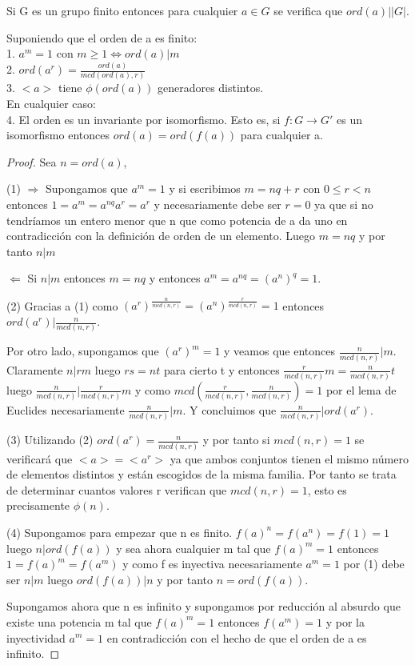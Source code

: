 \begin{ncor}
Si G es un grupo finito entonces para cualquier $a \in G$ se verifica que $ord(a) | |G|$.
\end{ncor}

\begin{nprop}
Suponiendo que el orden de a es finito: \\
1. $a^m = 1$ con $m \ge 1 \iff ord(a) | m$ \\
2. $ord(a^r) = \frac{ord(a)}{mcd(ord(a),r)}$ \\
3. $<a>$ tiene $\phi(ord(a))$ generadores distintos. \\
En cualquier caso: \\
4. El orden es un invariante por isomorfismo. Esto es, si $f:G \rightarrow G'$ es un isomorfismo entonces $ord(a) = ord(f(a))$ para cualquier a.
\end{nprop}
\begin{proof}
Sea $n = ord(a)$,

(1) $\Rightarrow$ Supongamos que $a^m = 1$ y si escribimos $m = nq + r$ con $0 \le r < n$ entonces $1=a^m = a^{nq}a^r = a^r$ y necesariamente debe ser $r = 0$ ya que si no tendríamos un entero menor que n que como potencia de a da uno en contradicción con la definición de orden de un elemento. Luego $m = nq$ y por tanto $n | m$

$\Leftarrow$ Si $n|m$ entonces $m = nq$ y entonces $a^m = a^{nq} = (a^n)^q = 1$.

(2) Gracias a (1) como $(a^r)^{\frac{n}{mcd(n,r)}} = (a^n)^{\frac{r}{mcd(n,r)}} = 1$ entonces $ord(a^r) | \frac{n}{mcd(n,r)}$. 

Por otro lado, supongamos que $(a^r)^m = 1$ y veamos que entonces $\frac{n}{mcd(n,r)} | m$. Claramente $n | rm$ luego $rs = nt$ para cierto t y entonces $\frac{r}{mcd(n,r)}m = \frac{n}{mcd(n,r)}t$ luego $\frac{n}{mcd(n,r)} | \frac{r}{mcd(n,r)}m$ y como $mcd\left(\frac{r}{mcd(n,r)},\frac{n}{mcd(n,r)}\right) = 1$ por el lema de Euclides necesariamente $\frac{n}{mcd(n,r)} | m$. Y concluimos que $\frac{n}{mcd(n,r)} | ord(a^r)$.

(3) Utilizando (2) $ord(a^r) = \frac{n}{mcd(n,r)}$ y por tanto si $mcd(n,r) = 1$  se verificará que $<a> = <a^r>$ ya que ambos conjuntos tienen el mismo número de elementos distintos y están escogidos de la misma familia. Por tanto se trata de determinar cuantos valores r verifican que $mcd(n,r) = 1$, esto es precisamente $\phi(n)$.

(4) Supongamos para empezar que n es finito. $f(a)^n=f(a^n)=f(1)=1$ luego $n |ord(f(a))$ y sea ahora cualquier m tal que $f(a)^m = 1$ entonces $1 = f(a)^m = f(a^m)$ y como f es inyectiva necesariamente $a^m = 1$ por (1) debe ser $n | m$ luego $ord(f(a)) | n$ y por tanto $n = ord(f(a))$.

Supongamos ahora que n es infinito y supongamos por reducción al absurdo que existe una potencia m tal que $f(a)^m = 1$ entonces $f(a^m) = 1$ y por la inyectividad $a^m = 1$ en contradicción con el hecho de que el orden de a es infinito.
\end{proof}

